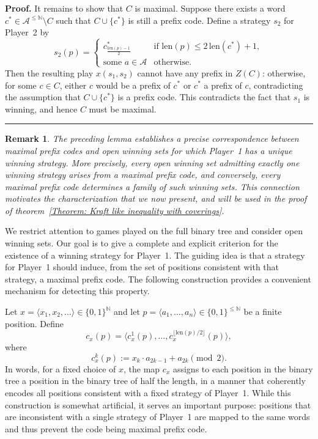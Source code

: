 \documentclass[a4,12pt]{article}%
\newtheorem{remark}[theorem]{Remark}
\newenvironment{proof}[1][Proof]{\textbf{#1.} }{\ \rule{0.5em}{0.5em}}
\begin{document}
\begin{proof}
It remains to show that $C$ is maximal. Suppose there exists a word
$c^\ast\in \mathcal{A}^{\leq\mathbb{N}}\setminus C$ such that
$C\cup\{c^\ast\}$ is still a prefix code. Define a strategy $s_2$ for Player~2 by
\[
s_2(p)=
\begin{cases}
c^\ast_{\frac{\mathrm{len}(p)-1}{2}}
& \text{if } \mathrm{len}(p)\leq 2\,\mathrm{len}(c^\ast)+1,\\[4pt]
\text{some } a \in \mathcal{A}  & \text{otherwise}.
\end{cases}
\]
Then the resulting play $x(s_1,s_2)$ cannot have any prefix in $Z(C)$: otherwise, for some $c\in C$, either $c$ would be a prefix of $c^\ast$ or $c^\ast$ a prefix of $c$, contradicting the assumption that $C\cup\{c^\ast\}$ is a prefix code. This contradicts the fact that $s_1$ is winning, and hence $C$ must be maximal.
\end{proof}

\begin{remark}
    The preceding lemma establishes a precise correspondence between maximal prefix codes and open winning sets for which Player~1 has a unique winning strategy. More precisely, every open winning set admitting exactly one winning strategy arises from a maximal prefix code, and conversely, every maximal prefix code determines a family of such winning sets.
    This connection motivates the characterization that we now present, and will be used in the proof of theorem~\ref{Theorem: Kraft like inequality with coverings}.
\end{remark}

We restrict attention to games played on the full binary tree and consider open winning sets. Our goal is to give a complete and explicit criterion for the existence of a winning strategy for Player~1. The guiding idea is that a strategy for Player~1 should induce, from the set of positions consistent with that strategy, a maximal prefix code. The following construction provides a convenient mechanism for detecting this property.

\medskip
Let $x=\langle x_1,x_2,\dots\rangle \in \{0,1\}^{\mathbb{N}}$ and let
$p=\langle a_1,\dots,a_n\rangle \in \{0,1\}^{\leq \mathbb{N}}$ be a finite position. Define
\[
c_x(p)
  = \langle c_x^1(p),\dots,c_x^{\lfloor \mathrm{len}(p)/2 \rfloor}(p)\rangle,
\]
where
\[
c_x^k(p) := x_k \cdot a_{2k-1} + a_{2k} \pmod{2}.
\]
In words, for a fixed choice of $x$, the map $c_x$ assigns to each position in the binary tree a position in the binary tree of half the length, in a manner that coherently encodes all positions consistent with a fixed strategy of Player~1. While this construction is somewhat artificial, it serves an important purpose: positions that are inconsistent with a single strategy of Player~1 are mapped to the same words and thus prevent the code being maximal prefix code.
\end{document}
